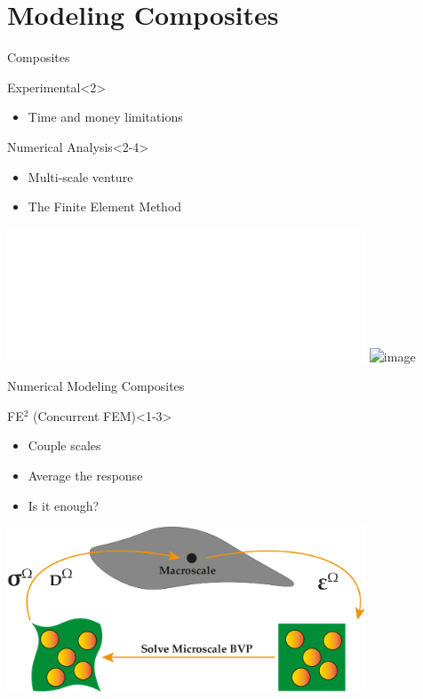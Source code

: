 \section{Modeling Composites}
\begin{frame}{Composites}
\begin{minipage}{0.45\textwidth}
  \begin{block}{\color{White}Experimental}<2>
    \begin{itemize}
      \item <2> Time and money limitations
    \end{itemize}
  \end{block} 
  \begin{block}{\color{White}Numerical Analysis}<2-4>
    \begin{itemize}
      \item <3> Multi-scale venture
      \item <4> The Finite Element Method
    \end{itemize}
  \end{block} 
\end{minipage}%
\hspace{1cm}
\begin{minipage}{0.45\textwidth}
    \centering
    \includegraphics<1-3>[width=0.8\textwidth]{Figures/intro/scales.pdf}
    \includegraphics<4>[width=0.8\textwidth]{Figures/intro/link.png}
\end{minipage}
\end{frame}

\begin{frame}{Numerical Modeling Composites}
\begin{minipage}{0.45\textwidth}
  \begin{block}{\color{White}FE$^2$ (Concurrent FEM)\cite{Feyel2003}}<1-3>
    \begin{itemize}
      \item <1> Couple scales \cite{Miehe2002, Miehe1999}
      \item <2> Average the response
      \item <3> Is it enough?
    \end{itemize}
  \end{block} 
\end{minipage}%
\hspace{1cm}
\begin{minipage}{0.45\textwidth}
    \centering
    \includegraphics[width=0.8\textwidth]{Figures/intro/FE2.pdf}
\end{minipage}
\end{frame}


